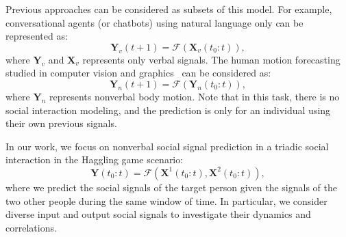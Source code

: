 Previous approaches can be considered as subsets of this model. For example, conversational agents (or chatbots) using natural language only can be represented as:
\begin{equation}
\mathbf{Y}_v (t+1) =  \mathcal{F} \left( \mathbf{X}_v (t_0:t) \right),
\end{equation}
where $\mathbf{Y}_v$ and $\mathbf{X}_v$ represents only verbal signals. The human motion forecasting studied in computer vision and graphics~\cite{Fragkiadaki_2015_ICCV, jain2016structural} can be considered as:
\begin{equation}
\mathbf{Y}_n (t+1) =  \mathcal{F} \left( \mathbf{Y}_n (t_0:t) \right),
\end{equation}
where $\mathbf{Y}_n$ represents nonverbal body motion. Note that in this task, there is no social interaction modeling, and the prediction is only for an individual using their own previous signals. 

In our work, we focus on nonverbal social signal prediction in a triadic social interaction in the Haggling game scenario:
\begin{equation}
\mathbf{Y} ( t_0:t ) =  \mathcal{F} \left( \mathbf{X}^1 (t_0:t), \mathbf{X}^2 (t_0:t) \right),
\label{equation:F_ours}
\end{equation}
where we predict the social signals of the target person given the signals of the two other people during the same window of time. In particular, we consider diverse input and output social signals to investigate their dynamics and correlations.

